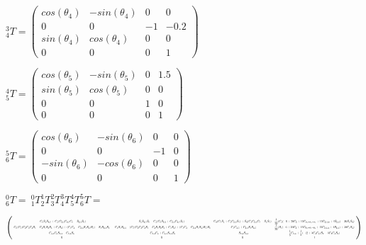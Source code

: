 \documentclass[8pt]{article}
\begin{document}
\begin{list}{()~}{}
$^3_4T = \left( \begin{array}{cccc}
cos(\theta_4) & -sin(\theta_4) & 0 & 0 \\
0 & 0 & -1 & -0.2 \\
sin(\theta_4) & cos(\theta_4) & 0 & 0 \\
0 & 0 & 0 & 1
\end{array} \right) $

$^4_5T = \left( \begin{array}{cccc}
cos(\theta_5) & -sin(\theta_5) & 0 & 1.5 \\
sin(\theta_5) & cos(\theta_5) & 0 & 0 \\
0 & 0 & 1 & 0 \\
0 & 0 & 0 & 1
\end{array} \right) $

$^5_6T = \left( \begin{array}{cccc}
cos(\theta_6) & -sin(\theta_6) & 0 & 0 \\
0 & 0 & -1 & 0 \\
-sin(\theta_6) & -cos(\theta_6) & 0 & 0 \\
0 & 0 & 0 & 1
\end{array} \right) $

$^0_6T = \ ^0_1T ^1_2T ^2_3T ^3_4T ^4_5T ^5_6T =$

\newcommand\scalemath[2]{\scalebox{#1}{\mbox{\ensuremath{\displaystyle #2}}}}

$ \left( 
\scalemath{0.38}{
\begin{array}{cccc}
-C_6 S_1 S_{4, 5} + C_1 (C_{2, 3} C_{4, 5} C_6 - S_{2,3} S_6)
&S_1 S_{4, 5} S_6 -  C_1 (C_6 S_{2,3} +  C_{2, 3} C_{4, 5} S_6)
&C_4 (C_5 S_1 + C_1 C_{2, 3} S_5) +  S_4 (C_1 C_{2, 3} C_5 - S_1 S_5)
&\dfrac{1}{20} (C_1 (-6 + 20 C_2 + 15 C_{\theta_2 + \theta_3 - \theta_4} +  15 C_{2, 3, 4} + 4 S_{2, 3}) - 30 S_1 S_4) \\
C_6 (C_5 (C_2 C_3 C_4 S_1 - C_4 S_1 S_2 S_3 + C_1 S_4) + (C_1 C_4 - C_{2, 3} S_1 S_4) S_5) - S_1 S_{2,3} S_6 &
-C_6 S_1 S_{2, 3} - (C_5 (C_2 C_3 C_4 S_1 - C_4 S_1 S_2 S_3 + C_1 S_4) + (C_1 C_4 - C_{2,3} S_1 S_4) S_5) S_6&
-C_1 C_{4, 5} + C_{2, 3} S_1 S_{4, 5}&
\dfrac{1}{20} (S_1 (-6 + 20 C_2 + 15 C_{\theta_2 + \theta_3 - \theta_4} + 15 C_{2, 3, 4} + 4 S_{2, 3}) +  30 C_1 S_4)\\
C_{4, 5} C_6 S_{2, 3} -  C_{2, 3} S_6 & 
-C_{2, 3} C_6 +  C_{4, 5} S_{2, 3} S_6 & 
-S_{2, 3} S_{4, 5}&
\dfrac{1}{5} C_{2, 3} + \dfrac{1}{2} (-(2 + 3 C_3 C_4) S_2 - 
3 C_2 C_4 S_3) \\
 0 & 0 & 0 & 1
\end{array}
}
 \right) $


\end{list}
\end{document}
